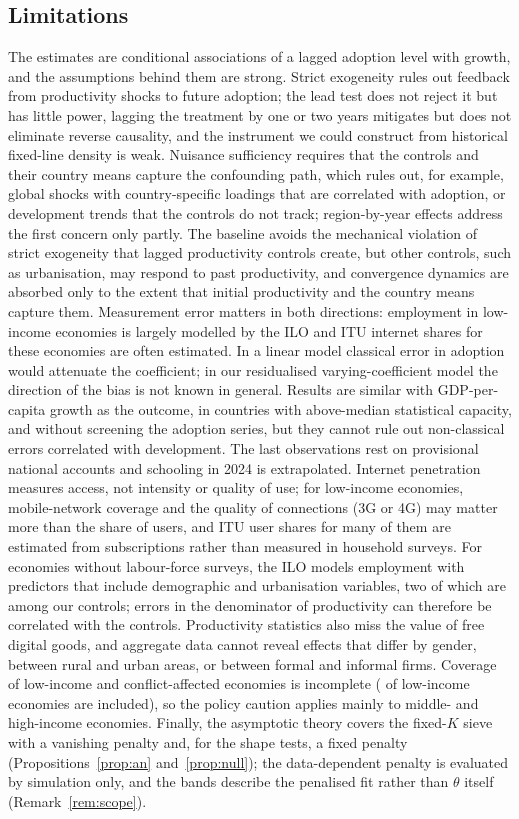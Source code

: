 \documentclass[pdflatex,sn-basic]{sn-jnl}%
\theoremstyle{thmstyleone}
\theoremstyle{thmstyletwo}
\begin{document}
\subsection{Limitations}

The estimates are conditional associations of a lagged adoption level with growth, and the assumptions behind them are strong. Strict exogeneity rules out feedback from productivity shocks to future adoption; the lead test does not reject it but has little power, lagging the treatment by one or two years mitigates but does not eliminate reverse causality, and the instrument we could construct from historical fixed-line density is weak. Nuisance sufficiency requires that the controls and their country means capture the confounding path, which rules out, for example, global shocks with country-specific loadings that are correlated with adoption, or development trends that the controls do not track; region-by-year effects address the first concern only partly. The baseline avoids the mechanical violation of strict exogeneity that lagged productivity controls create, but other controls, such as urbanisation, may respond to past productivity, and convergence dynamics are absorbed only to the extent that initial productivity and the country means capture them. Measurement error matters in both directions: employment in low-income economies is largely modelled by the ILO and ITU internet shares for these economies are often estimated. In a linear model classical error in adoption would attenuate the coefficient; in our residualised varying-coefficient model the direction of the bias is not known in general. Results are similar with GDP-per-capita growth as the outcome, in countries with above-median statistical capacity, and without screening the adoption series, but they cannot rule out non-classical errors correlated with development. The last observations rest on provisional national accounts and schooling in 2024 is extrapolated. Internet penetration measures access, not intensity or quality of use; for low-income economies, mobile-network coverage and the quality of connections (3G or 4G) may matter more than the share of users, and ITU user shares for many of them are estimated from subscriptions rather than measured in household surveys. For economies without labour-force surveys, the ILO models employment with predictors that include demographic and urbanisation variables, two of which are among our controls; errors in the denominator of productivity can therefore be correlated with the controls. Productivity statistics also miss the value of free digital goods, and aggregate data cannot reveal effects that differ by gender, between rural and urban areas, or between formal and informal firms. Coverage of low-income and conflict-affected economies is incomplete ( of  low-income economies are included), so the policy caution applies mainly to middle- and high-income economies. Finally, the asymptotic theory covers the fixed-$K$ sieve with a vanishing penalty and, for the shape tests, a fixed penalty (Propositions~\ref{prop:an} and~\ref{prop:null}); the data-dependent penalty is evaluated by simulation only, and the bands describe the penalised fit rather than $\theta$ itself (Remark~\ref{rem:scope}).
\end{document}
